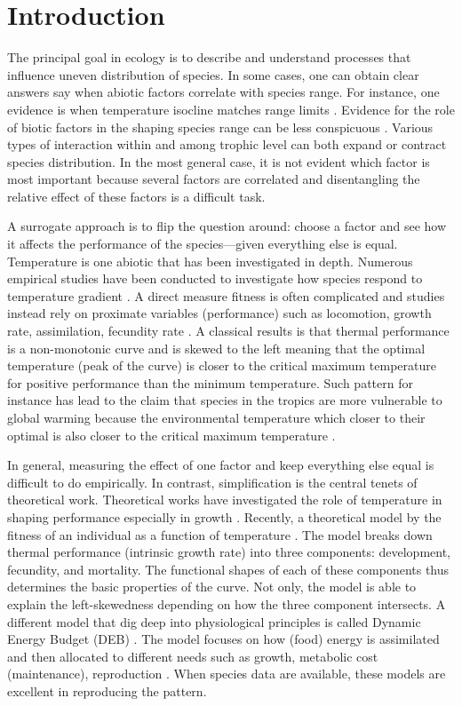 \section*{Introduction}
The principal goal in ecology is to describe and understand processes that influence uneven distribution of species.
In some cases, one can obtain clear answers say when abiotic factors correlate with species range.
For instance, one evidence is when temperature isocline matches  range limits \citep{Root1988}.
Evidence for the role of biotic factors in the shaping species range can be less conspicuous \citep{Krebs2000}.
Various types of interaction within and among trophic level can both expand or contract species distribution.
In the most general case, it is not evident which factor is most important because several factors are correlated and disentangling the relative effect of these factors is a difficult task.

A surrogate approach is to flip the question around: choose a factor and see how it affects the performance of the species---given everything else is equal.
Temperature is one abiotic that has been investigated in depth.
Numerous empirical studies have been conducted to investigate how species respond to temperature gradient \citep[e.g.,][]{Angilletta2009}.
A direct measure fitness is often complicated and studies instead rely on proximate variables (performance) such as locomotion, growth rate, assimilation, fecundity rate \citep[][and reference therein]{Angilletta2009}.
A classical results is that thermal performance is a non-monotonic curve and is skewed to the left meaning that the optimal temperature (peak of the curve) is closer to the critical maximum temperature for positive performance than the minimum temperature. 
Such pattern for instance has lead to the claim that species in the tropics are more vulnerable to global warming because the environmental temperature which closer to their optimal  is also  closer to the critical maximum temperature \citep{Deutsch2008}.

In general, measuring the effect of one factor and keep everything else equal  is difficult to do empirically.
In contrast, simplification is the central tenets of theoretical work.
Theoretical works have investigated the role of temperature in shaping performance especially in growth \citep{VandH1996,Koslowski2004}.
Recently, a theoretical model by \citet{Amarasekare2012} the fitness of an individual as a function of temperature \citep{Amarasekare2012}.
The model  breaks down thermal performance (intrinsic growth rate)  into three components: development, fecundity, and mortality.
The functional shapes of each of these components thus determines the basic properties of the curve.
Not only, the model is able to explain the left-skewedness depending on how the three component intersects. 
A different model that dig deep into physiological principles is called Dynamic Energy Budget (DEB) \citep{Kooijman2009}.
The model focuses on how (food) energy is assimilated and then allocated to different needs such as growth, metabolic cost (maintenance), reproduction \citep{Kooijman2009}.
When species data are available, these models are excellent in reproducing the pattern. 

